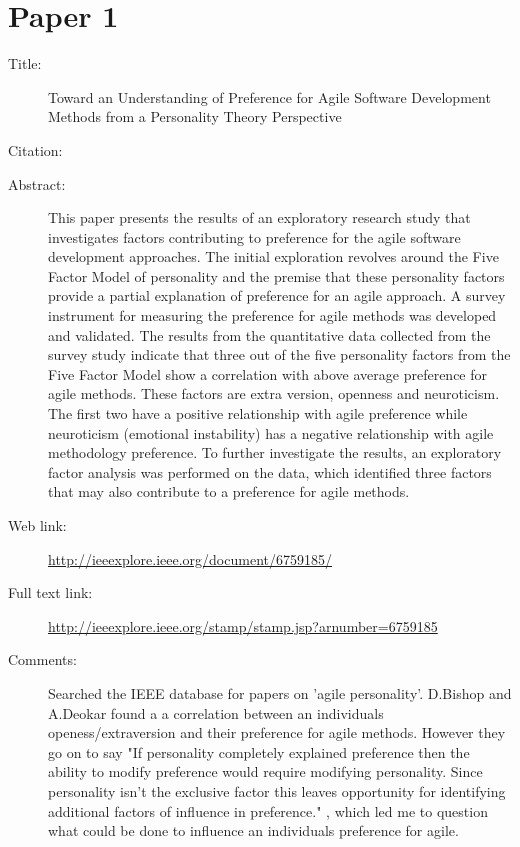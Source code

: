 \documentclass{scrartcl}
\begin{document}
\section*{Paper 1}
\begin{description}
\item[Title:] Toward an Understanding of Preference for Agile Software Development Methods from a Personality Theory Perspective
\item[Citation:] \cite{Paper1}
\item[Abstract:] This paper presents the results of an exploratory research study that investigates factors contributing to preference 
for the agile software development approaches. The initial exploration revolves around the Five Factor Model of personality and the 
premise that these personality factors provide a partial explanation of preference for an agile approach. A survey instrument for 
measuring the preference for agile methods was developed and validated. The results from the quantitative data collected from the survey 
study indicate that three out of the five personality factors from the Five Factor Model show a correlation with above average 
preference for agile methods. These factors are extra version, openness and neuroticism. The first two have a positive relationship with 
agile preference while neuroticism (emotional instability) has a negative relationship with agile methodology preference. To further 
investigate the results, an exploratory factor analysis was performed on the data, which identified three factors that may also 
contribute to a preference for agile methods.
\item[Web link:] \url{http://ieeexplore.ieee.org/document/6759185/}
\item[Full text link:] \url{http://ieeexplore.ieee.org/stamp/stamp.jsp?arnumber=6759185}
\item[Comments:] Searched the IEEE database for papers on 'agile personality'. D.Bishop and A.Deokar found a a correlation between an individuals openess/extraversion and their preference for agile methods. However they go on to say "If personality completely explained preference then the ability to modify preference would require modifying personality. Since personality isn't the exclusive factor this leaves opportunity for identifying additional factors of influence in preference." \cite{Paper1}, which led me to question what could be done to influence an individuals preference for agile.
\end{description}
\end{document}
